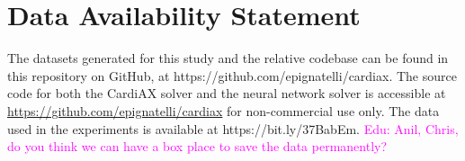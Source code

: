 \documentclass[utf8]{frontiersSCNS} %
\newcommand{\Edu}[1]{\textcolor{magenta}{Edu: #1}}
\begin{document}
\section*{Data Availability Statement}
The datasets generated for this study and the relative codebase can be found in this repository on GitHub, at https://github.com/epignatelli/cardiax.
The source code for both the CardiAX solver and the neural network solver is accessible at \hyperlink{https://github.com/epignatelli/cardiax}{https://github.com/epignatelli/cardiax} for non-commercial use only.
The data used in the experiments is available at https://bit.ly/37BabEm.
\Edu{Anil, Chris, do you think we can have a box place to save the data permanently?}


\end{document}
